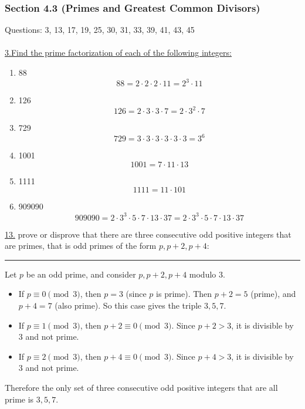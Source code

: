 \documentclass[12pt]{article}
\begin{document}
\newpage
\subsubsection*{Section 4.3 (Primes and Greatest Common Divisors)}
Questions: 3, 13, 17, 19, 25, 30, 31, 33, 39, 41, 43, 45
\\\\

\noindent\underline{3.\;Find the prime factorization of each of the following integers:}
\begin{enumerate}[label=(\alph*)]
    \item 88
    \[
    88 = 2 \cdot 2 \cdot 2 \cdot 11 = 2^3 \cdot 11
    \]
    \item 126
    \[
    126 = 2 \cdot 3 \cdot 3 \cdot 7 = 2 \cdot 3^2 \cdot 7
    \]
    \item 729
    \[
    729 = 3 \cdot 3 \cdot 3 \cdot 3 \cdot 3 \cdot 3 = 3^6
    \]
    \item 1001
    \[
    1001 = 7 \cdot 11 \cdot 13
    \]
    \item 1111
    \[
    1111 = 11 \cdot 101
    \]
    \item 909090
    \[
    909090 = 2 \cdot 3^3 \cdot 5 \cdot 7 \cdot 13 \cdot 37 = 2 \cdot 3^3 \cdot 5 \cdot 7 \cdot 13 \cdot 37
    \]
\end{enumerate}

\vspace{3.3mm}
\noindent\underline{13.} prove or disprove that there are three consecutive odd positive integers that are primes, that is odd primes of the form $p, p+2, p+4$:
\\\rule{\linewidth}{0.5pt}
\indent Let $p$ be an odd prime, and consider $p, p+2, p+4$ modulo $3$.
\begin{itemize}
    \item If $p \equiv 0 \pmod{3}$, then $p=3$ (since $p$ is prime). Then $p+2=5$ (prime), and $p+4=7$ (also prime). So this case gives the triple $3,5,7$.
    \item If $p \equiv 1 \pmod{3}$, then $p+2 \equiv 0 \pmod{3}$. Since $p+2 > 3$, it is divisible by 3 and not prime.
    \item If $p \equiv 2 \pmod{3}$, then $p+4 \equiv 0 \pmod{3}$. Since $p+4 > 3$, it is divisible by 3 and not prime.
\end{itemize}
Therefore the only set of three consecutive odd positive integers that are all prime is $3,5,7$.
\end{document}
